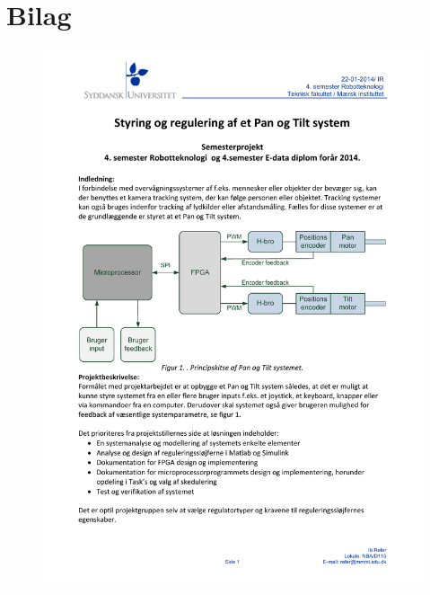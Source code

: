 \part{Bilag}

\begin{figure}[th!]
\centering
\includegraphics[scale=0.74125]{./content/Projekt_2014-1.pdf}
\end{figure}
\newpage
